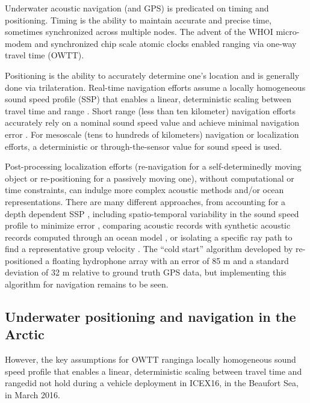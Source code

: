 Underwater acoustic navigation (and GPS) is predicated on timing and positioning.
Timing is the ability to maintain accurate and precise time, sometimes synchronized across multiple nodes.
The advent of the WHOI micro-modem \citep{singh_underwater_2006} and synchronized chip scale atomic clocks \citep{gardner_second_2016} enabled ranging via one-way travel time (OWTT).

Positioning is the ability to accurately determine one's location and is generally done via trilateration.
Real-time navigation efforts assume a locally homogeneous sound speed profile (SSP) that enables a linear, deterministic scaling between travel time and range \citep{eustice_recent_2006,eustice_experimental_2007,webster_preliminary_2009,webster_advances_2012}.
Short range (less than ten kilometer) navigation efforts accurately rely on a nominal sound speed value and achieve minimal navigation error \cite{eustice_experimental_2007,webster_preliminary_2009,kepper_mems_2017}.
For mesoscale (tens to hundreds of kilometers) navigation or localization efforts, a deterministic \citep{graupe_preliminary_2019} or through-the-sensor \citep{webster_towards_2015} value for sound speed is used.

Post-processing localization efforts (re-navigation for a self-determinedly moving object or re-positioning for a passively moving one), without computational or time constraints, can indulge more complex acoustic methods and/or ocean representations.
There are many different approaches, from accounting for a depth dependent SSP \citep{van_uffelen_localization_2016}, including spatio-temporal variability in the sound speed profile to minimize error \citep{graupe_preliminary_2019, mikhalevsky_deep_2020}, comparing acoustic records with synthetic acoustic records computed through an ocean model \citep{wu_deep_2019}, or isolating a specific ray path to find a representative group velocity \citep{mikhalevsky_deep_2020}.
The ``cold start'' algorithm developed by \citet{mikhalevsky_deep_2020} re-positioned a floating hydrophone array with an error of 85 m and a standard deviation of 32 m relative to ground truth GPS data, but implementing this algorithm for navigation remains to be seen.

\subsection{Underwater positioning and navigation in the Arctic}


However, the key assumptions for OWTT ranging\textemdash a locally homogeneous sound speed profile that enables a linear, deterministic scaling between travel time and range\textemdash did not hold during a vehicle deployment in ICEX16, in the Beaufort Sea, in March 2016.

